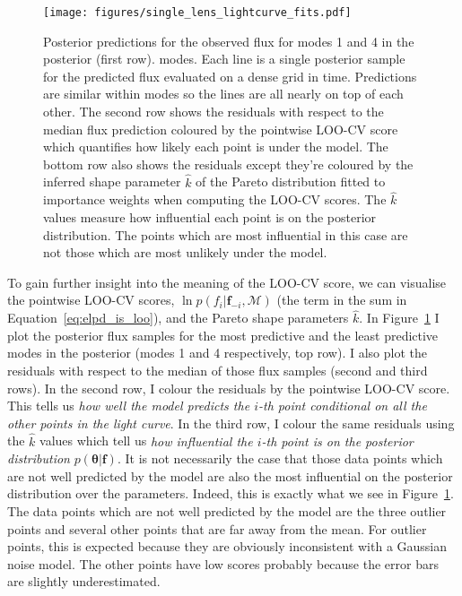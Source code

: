 \documentclass[12pt,dvipsnames]{report}
\renewcommand{\vec}[1]{\boldsymbol{\mathbf{#1}}}
\begin{document}
\begin{figure}[t]
    \begin{centering}
        \texttt{[image: figures/single\_lens\_lightcurve\_fits.pdf]}
        \caption{Posterior predictions for the observed flux for modes 1 and 4 in
        the posterior (first row).
        modes. Each line is a single posterior sample for the predicted flux evaluated
        on a dense grid in time. Predictions are similar within modes so the lines 
        are all nearly on top of each other. The second row shows the residuals with 
        respect to the median flux prediction coloured by the pointwise LOO-CV score
        which quantifies how likely each point is under the model.
        The bottom row also shows the residuals except they're coloured by the inferred 
        shape parameter $\hat k$ of the Pareto distribution fitted to importance weights 
        when computing the LOO-CV scores. The $\hat k$ values measure how influential 
        each point is on the posterior distribution. The points which are most 
        influential in this case are not those which are most unlikely under the model.}
            \label{fig:ogle_lightcurve_fits}
    \end{centering}
\end{figure}

To gain further insight into the meaning of the LOO-CV score, we can visualise the 
pointwise LOO-CV scores, $\ln p\left(f_{i} \lvert \vec f_{-i},\mathcal{M}\right)$ 
(the term in the sum in Equation~\ref{eq:elpd_is_loo}), and the Pareto shape parameters
$\hat k$.
In Figure~\ref{fig:ogle_lightcurve_fits} I plot the posterior flux samples for the most 
predictive and the least predictive modes in the posterior (modes 1 and 4 respectively,
top row). I also plot the residuals with respect to the median of those 
flux samples (second and third rows). In the second row, I colour the residuals by the 
pointwise LOO-CV score. 
This tells us \emph{how well the model predicts the $i$-th point conditional on all the other 
points in the light curve}. In the third row, I colour the same residuals using the
$\hat k$ values which tell us \emph{how influential the $i$-th point is on 
the posterior distribution} $p(\vec\theta|\vec f)$. It is not necessarily the case that those 
data points which are not well predicted by the model are also the most influential on the posterior distribution over the 
parameters. Indeed, this is exactly what we see in 
Figure~\ref{fig:ogle_lightcurve_fits}. The data points which 
are not well predicted by the model are the three outlier points and several other points 
that are far away from the mean. For outlier points, this is expected
because they are obviously inconsistent with a Gaussian noise model. The other points 
have low scores probably because the error bars are slightly underestimated. 
\end{document}
